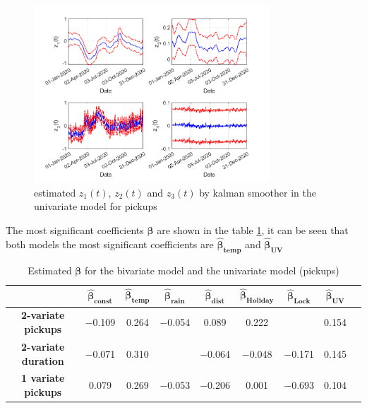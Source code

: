 \begin{figure}
	\centering
	\includegraphics[height=250px]{Images/biv_sel.png}
	\caption[Estimated of latent z]{estimated $z_{1}(t)$,  $z_{2}(t)$ and $z_{3}(t)$ by kalman smoother in the univariate model for pickups}
	\label{Trend_zeta_latente}
\end{figure}

The most significant coefficients $\boldsymbol{\hat{\beta}}$ are shown in the  table \ref{z_latent trend}, it can be seen that both models the most significant coefficients are $\boldsymbol{\hat{\beta}_{temp}}$ and $\boldsymbol{\hat{\beta}_{UV}}$
 \begin{table}
	\centering
	\renewcommand\arraystretch{1.3}
	\begin{tabular}{c|c|c|c|c|c|c|c|c}
		\hline
		\textit{} & $\boldsymbol{\hat{\beta}_{const}}$ & $\boldsymbol{\hat{\beta}_{temp}}$ & $\boldsymbol{\hat{\beta}_{rain}}$ & $\boldsymbol{\hat{\beta}_{dist}}$ & $\boldsymbol{\hat{\beta}_{Holiday}}$ & $\boldsymbol{\hat{\beta}_{Lock}}$ & $\boldsymbol{\hat{\beta}_{UV}}$   \\
		\hline
		\textbf{2-variate pickups} & \num{-0.109} & \num{+0.264} & \num{-0.054} & \num{+0.089} & \num{+0.222} &  & \num{+0.154}  \\
		\hline
		\textbf{2-variate duration} & \num{-0.071} & \num{+0.310} &  & \num{-0.064} & \num{-0.048} & \num{-0.171} & \num{+0.145}  \\
		\hline
		\textbf{1 variate pickups} & \num{+0.079} & \num{+0.269} & \num{-0.053} & \num{-0.206} & \num{+0.001} & \num{-0.693} & \num{+0.104}\\
		\hline
	\end{tabular}
	\caption[Estimated $\boldsymbol{\beta}$ for the multivariate model model and the univariate model (pickups-DCM)]{Estimated $\boldsymbol{\beta}$ for the bivariate model and the univariate model (pickups) }
	\label{z_latent trend}
\end{table}